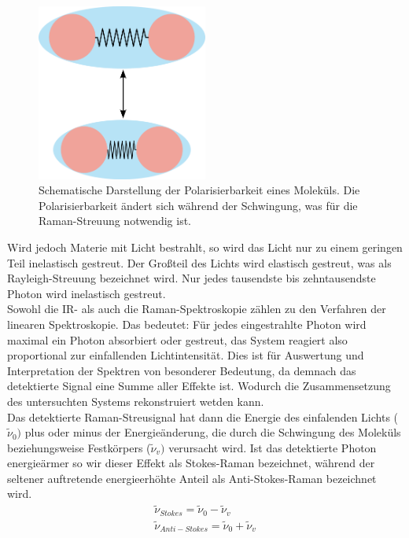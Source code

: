 \begin{figure}[H]
    \centering
    \includegraphics[width=0.5\textwidth]{1_Skript/Inkscape/Polarisierbarkeit.png}
    \caption{Schematische Darstellung der Polarisierbarkeit eines Moleküls. Die Polarisierbarkeit ändert sich während der Schwingung, was für die Raman-Streuung notwendig ist.}
    \label{fig:Polarisierbarkeit}
\end{figure}

Wird jedoch Materie mit Licht bestrahlt, so wird das Licht nur zu einem geringen Teil inelastisch gestreut. Der Großteil des Lichts wird elastisch gestreut, was als Rayleigh-Streuung bezeichnet wird.
Nur jedes tausendste bis zehntausendste Photon wird inelastisch gestreut.\\
Sowohl die IR- als auch die Raman-Spektroskopie zählen zu den Verfahren der linearen Spektroskopie.
Das bedeutet: Für jedes eingestrahlte Photon wird maximal ein Photon absorbiert oder gestreut, das System reagiert also proportional zur einfallenden Lichtintensität. Dies ist für 
Auswertung und Interpretation der Spektren von besonderer Bedeutung, da demnach das detektierte Signal eine Summe aller Effekte ist. Wodurch die Zusammensetzung des untersuchten Systems 
rekonstruiert wetden kann.\\

Das detektierte Raman-Streusignal hat dann die Energie des einfalenden Lichts ($\tilde{\nu}_0)$ plus oder minus der Energieänderung, die durch die Schwingung 
des Moleküls beziehungsweise Festkörpers ($\tilde{\nu}_v)$ verursacht wird.
Ist das detektierte Photon energieärmer so wir dieser Effekt als Stokes-Raman bezeichnet, während der seltener auftretende energieerhöhte Anteil als Anti-Stokes-Raman bezeichnet wird.
\begin{eqnarray}
    \tilde{\nu}_{Stokes} = \tilde{\nu}_0 - \tilde{\nu}_v 
    \label{eq:stokes} \\
    \tilde{\nu}_{Anti-Stokes} = \tilde{\nu}_0 + \tilde{\nu}_v
    \label{eq:anti-stokes}  
\end{eqnarray}

